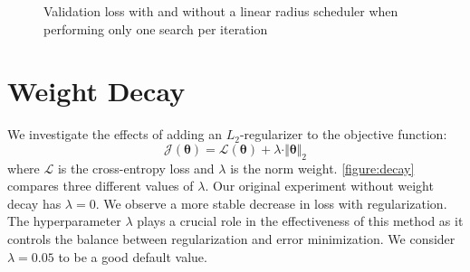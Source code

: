 \begin{figure}
    \centering
    \caption[Validation loss with and without a radius scheduler with only one search per iteration]
    {Validation loss with and without a linear radius 
    scheduler when performing only one search per iteration}
    \label{figure:schedule2}
\end{figure}

\section{Weight Decay}
We investigate the effects of adding an $L_2$-regularizer 
to the objective function:
\begin{equation}
    \mathcal{J}(\bm{\theta}) = \mathcal{L}(\bm{\theta}) + \lambda \cdot \Vert \bm{\theta} \Vert_2
\end{equation}
where $\mathcal{L}$ is the cross-entropy loss and 
$\lambda$ is the norm weight. 
\autoref{figure:decay} compares three different values
of $\lambda$. Our original experiment without weight decay
has $\lambda = 0$. We observe a more stable decrease in 
loss with regularization. The hyperparameter $\lambda$ 
plays a crucial role in the effectiveness of this method 
as it controls the balance between regularization
and error minimization. We consider
$\lambda = 0.05$ to be a good default value. 

